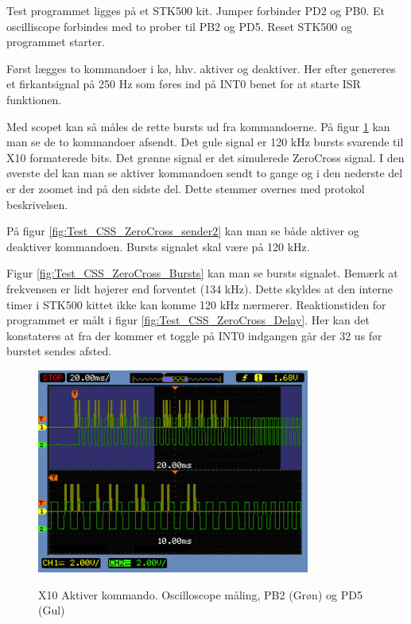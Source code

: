 Test programmet ligges på et STK500 kit.
Jumper forbinder PD2 og PB0. Et oscilliscope forbindes med to prober til PB2 og PD5.
Reset STK500 og programmet starter.

Først lægges to kommandoer i kø, hhv. aktiver og deaktiver. Her efter genereres et firkantsignal på 250 Hz som føres ind på INT0 benet for at starte ISR funktionen.

Med scopet kan så måles de rette bursts ud fra kommandoerne. På figur \ref{fig:Test_CSS_ZeroCross_sender1} kan man se de to kommandoer afsendt. Det gule signal er 120 kHz bursts svarende til X10 formaterede bits. Det grønne signal er det simulerede ZeroCross signal. I den øverste del kan man se aktiver kommandoen sendt to gange og i den nederste del er der zoomet ind på den sidste del. Dette stemmer overnes med protokol beskrivelsen.

På figur \ref{fig:Test_CSS_ZeroCross_sender2} kan man se både aktiver og deaktiver kommandoen.
Bursts signalet skal være på 120 kHz. 

Figur \ref{fig:Test_CSS_ZeroCross_Bursts} kan man se bursts signalet. Bemærk at frekvensen er lidt højerer end forventet (134 kHz). Dette skyldes at den interne timer i STK500 kittet ikke kan komme 120 kHz nærmerer.
Reaktionstiden for programmet er målt i figur \ref{fig:Test_CSS_ZeroCross_Delay}. Her kan det konstateres at fra der kommer et toggle på INT0 indgangen går der 32 us før burstet sendes afsted.

\begin{figure}[!htb]
	\centering
     {\includegraphics[width=0.8\textwidth]{billeder/SWTest/X10IF_Test_Afsend_1_kommando}}
     \caption{X10 Aktiver kommando. Oscilloscope måling, PB2 (Grøn) og PD5 (Gul)}
     \label{fig:Test_CSS_ZeroCross_sender1}
\end{figure}


